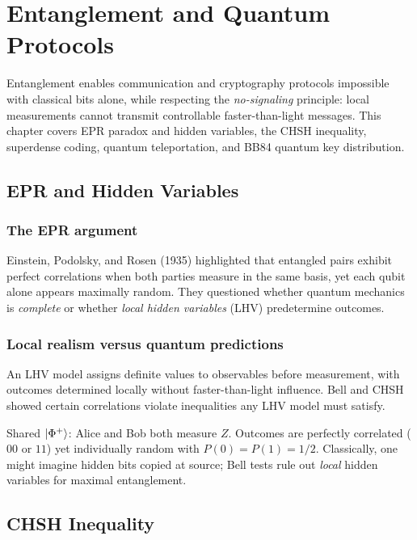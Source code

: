 \chapter{Entanglement and Quantum Protocols}
\label{ch:protocols}

Entanglement enables communication and cryptography protocols impossible with classical bits alone, while respecting the \emph{no-signaling} principle: local measurements cannot transmit controllable faster-than-light messages. This chapter covers EPR paradox and hidden variables, the CHSH inequality, superdense coding, quantum teleportation, and BB84 quantum key distribution.

\section{EPR and Hidden Variables}
\label{sec:epr}

\subsection{The EPR argument}

Einstein, Podolsky, and Rosen (1935) highlighted that entangled pairs exhibit perfect correlations when both parties measure in the same basis, yet each qubit alone appears maximally random. They questioned whether quantum mechanics is \emph{complete} or whether \emph{local hidden variables} (LHV) predetermine outcomes.

\subsection{Local realism versus quantum predictions}

An LHV model assigns definite values to observables before measurement, with outcomes determined locally without faster-than-light influence. Bell and CHSH showed certain correlations violate inequalities any LHV model must satisfy.

\begin{example}
Shared $\ket{\Phi^+}$: Alice and Bob both measure $Z$. Outcomes are perfectly correlated ($00$ or $11$) yet individually random with $P(0)=P(1)=1/2$. Classically, one might imagine hidden bits copied at source; Bell tests rule out \emph{local} hidden variables for maximal entanglement.
\end{example}

\section{CHSH Inequality}
\label{sec:chsh}

